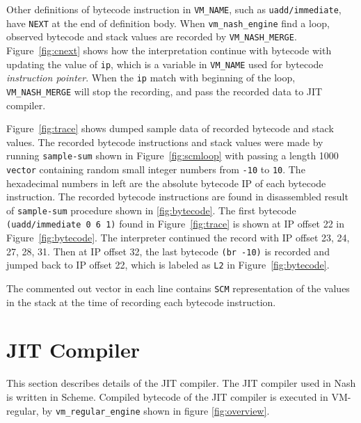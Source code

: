 \documentclass[preprint]{sigplanconf}
\begin{document}
Other definitions of bytecode instruction in \texttt{VM\_NAME}, such as
\texttt{uadd/immediate}, have \texttt{NEXT} at the end of definition
body. When \texttt{vm\_nash\_engine} find a loop, observed bytecode and stack
values are recorded by
\texttt{VM\_NASH\_MERGE}. Figure~\hyperref[fig:cnext]{\ref{fig:cnext}} shows
how the interpretation continue with bytecode with updating the value of
\texttt{ip}, which is a variable in \texttt{VM\_NAME} used for bytecode
\textit{instruction pointer}. When the \texttt{ip} match with beginning of the
loop, \texttt{VM\_NASH\_MERGE} will stop the recording, and pass the recorded
data to JIT compiler.

Figure~\hyperref[fig:trace]{\ref{fig:trace}} shows dumped sample data of
recorded bytecode and stack values. The recorded bytecode instructions and
stack values were made by running \texttt{sample-sum} shown in
Figure~\hyperref[fig:scmloop]{\ref{fig:scmloop}} with passing a length 1000
\texttt{vector} containing random small integer numbers from \texttt{-10} to
\texttt{10}. The hexadecimal numbers in left are the absolute bytecode IP of
each bytecode instruction. The recorded bytecode instructions are found in
disassembled result of \texttt{sample-sum} procedure shown in
\hyperref[fig:bytecode]{\ref{fig:bytecode}}. The first bytecode
\texttt{(uadd/immediate 0 6 1)} found in
Figure~\hyperref[fig:trace]{\ref{fig:trace}} is shown at IP offset 22 in
Figure~\hyperref[fig:bytecode]{\ref{fig:bytecode}}. The interpreter continued
the record with IP offset 23, 24, 27, 28, 31. Then at IP offset 32, the last
bytecode \texttt{(br -10)} is recorded and jumped back to IP offset 22, which
is labeled as \texttt{L2} in
Figure~\hyperref[fig:bytecode]{\ref{fig:bytecode}}.

The commented out vector in each line contains \texttt{SCM} representation of
the values in the stack at the time of recording each bytecode instruction.


\section{JIT Compiler}
\label{sec:compiler}

This section describes details of the JIT compiler. The JIT compiler used in
Nash is written in Scheme. Compiled bytecode of the JIT compiler is executed
in VM-regular, by \texttt{vm\_regular\_engine} shown in figure
\hyperref[fig:overview]{\ref{fig:overview}}.
\end{document}
